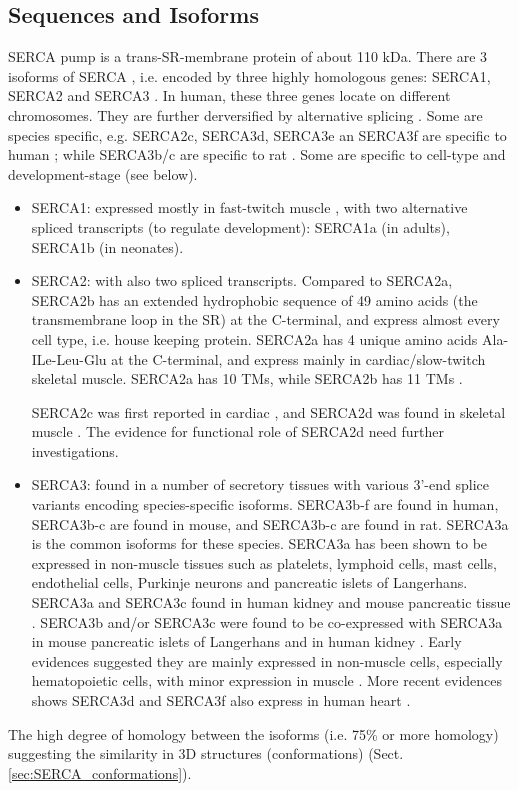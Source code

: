 \subsection{Sequences and Isoforms}

SERCA pump is a trans-SR-membrane protein of about 110 kDa. There are 3 isoforms
of SERCA \citep{misquitta1999}, i.e. encoded by three highly homologous genes:
SERCA1, SERCA2 and SERCA3 \citep{arai1994}. In human, these three genes locate
on different chromosomes. They are further derversified by alternative splicing
\citep{Periasamy2007, Periasamy2008}. Some are species specific, e.g. SERCA2c,
SERCA3d, SERCA3e an SERCA3f are specific to human \citep{Dally2010}; while
SERCA3b/c are specific to rat \citep{Martin2000}.
Some are specific to cell-type and development-stage (see below).

\begin{itemize}
  \item SERCA1: expressed mostly in fast-twitch muscle \citep{zhang1995}, with
  two alternative spliced transcripts (to regulate development): SERCA1a (in
  adults), SERCA1b (in neonates).
  
  \item SERCA2: with also two spliced transcripts. Compared to SERCA2a, SERCA2b
  has an extended hydrophobic sequence of 49 amino acids (the transmembrane loop
  in the SR) at the C-terminal, and express almost every cell type, i.e.
  house keeping protein. SERCA2a has 4 unique amino acids Ala-ILe-Leu-Glu at the
  C-terminal, and express mainly in cardiac/slow-twitch skeletal muscle. SERCA2a
  has 10 TMs, while SERCA2b has 11 TMs \citep{lytton1988}.
  
  SERCA2c was first reported in cardiac \citep{Dally2006}, and SERCA2d was
  found in skeletal muscle \citep{kimura2005}. The evidence for 
  functional role of SERCA2d need further investigations.
  
  \item SERCA3: found in a number of secretory tissues with various 3'-end
  splice variants encoding species-specific isoforms. SERCA3b-f are found in
  human, SERCA3b-c are found in mouse, and SERCA3b-c are found in rat.
  SERCA3a is the common isoforms for these species.
  SERCA3a has been shown to be expressed in non-muscle tissues such as
  platelets, lymphoid cells, mast cells, endothelial cells, Purkinje neurons and
  pancreatic islets of Langerhans. SERCA3a and SERCA3c found in human kidney and
  mouse pancreatic tissue \citep{Martin2002}. 
  SERCA3b and/or SERCA3c were found to be co-expressed with SERCA3a in mouse
  pancreatic islets of Langerhans and in human kidney \citep{dode1998}.  Early
  evidences suggested they are mainly expressed in non-muscle cells, especially hematopoietic cells, with
  minor expression in muscle \citep{Periasamy2007}. More recent evidences shows
  SERCA3d and SERCA3f also express in human heart \citep{Dally2009}.
   
\end{itemize} 
The high degree of homology between the isoforms (i.e. 75\% or more homology)
suggesting the similarity in 3D structures (conformations) \citep{Periasamy2007}
(Sect.\ref{sec:SERCA_conformations}).


